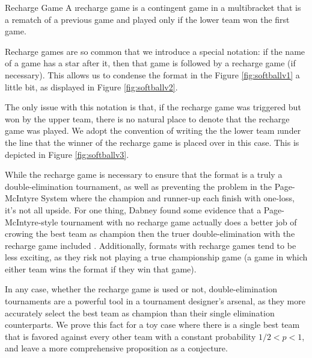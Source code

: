 {    \begin{definition}{Recharge Game}{}
        A \i{recharge game} is a contingent game in a multibracket that is a rematch of a previous game and played only if the lower team won the first game.
    \end{definition}

    Recharge games are so common that we introduce a special notation: if the name of a game has a star after it, then that game is followed by a recharge game (if necessary). This allows us to condense the format in the Figure \ref{fig:softballv1} a little bit, as displayed in Figure \ref{fig:softballv2}.


    The only issue with this notation is that, if the recharge game was triggered but won by the upper team, there is no natural place to denote that the recharge game was played. We adopt the convention of writing the the lower team \i{under} the line that the winner of the recharge game is placed over in this case. This is depicted in Figure \ref{fig:softballv3}.
    

    While the recharge game is necessary to ensure that the format is a truly a double-elimination tournament, as well as preventing the problem in the Page-McIntyre System where the champion and runner-up each finish with one-loss, it's not all upside. For one thing, Dabney found some evidence that a Page-McIntyre-style tournament with no recharge game actually does a better job of crowing the best team as champion then the truer double-elimination with the recharge game included \cite{recharge_rounds}. Additionally, formats with recharge games tend to be less exciting, as they risk not playing a true championship game (a game in which either team wins the format if they win that game).

    In any case, whether the recharge game is used or not, double-elimination tournaments are a powerful tool in a tournament designer's arsenal, as they more accurately select the best team as champion than their single elimination counterparts. We prove this fact for a toy case where there is a single best team that is favored against every other team with a constant probability $1/2 < p < 1$, and leave a more comprehensive proposition as a conjecture.

    }
